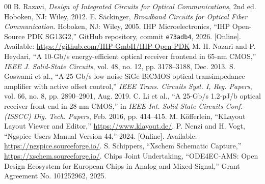 \documentclass[conference]{IEEEtran}
\begin{document}
\begin{thebibliography}{00}
 B. Razavi, \textit{Design of Integrated Circuits for Optical Communications}, 2nd ed. Hoboken, NJ: Wiley, 2012.
 E. S\"ackinger, \textit{Broadband Circuits for Optical Fiber Communication}. Hoboken, NJ: Wiley, 2005.
 IHP Microelectronics, ``IHP Open-Source PDK SG13G2,'' GitHub repository, commit \texttt{e73adb4}, 2026. [Online]. Available: \url{https://github.com/IHP-GmbH/IHP-Open-PDK}
 M. H. Nazari and P. Heydari, ``A 10-Gb/s energy-efficient optical receiver frontend in 65-nm CMOS,'' \textit{IEEE J. Solid-State Circuits}, vol. 48, no. 12, pp. 3178--3188, Dec. 2013.
 S. Goswami et al., ``A 25-Gb/s low-noise SiGe-BiCMOS optical transimpedance amplifier with active offset control,'' \textit{IEEE Trans. Circuits Syst. I, Reg. Papers}, vol. 66, no. 8, pp. 2890--2901, Aug. 2019.
 C. Li et al., ``A 25-Gb/s 1.2-pJ/b optical receiver front-end in 28-nm CMOS,'' in \textit{IEEE Int. Solid-State Circuits Conf. (ISSCC) Dig. Tech. Papers}, Feb. 2016, pp. 414--415.
 M. K\"offerlein, ``KLayout Layout Viewer and Editor,'' \url{https://www.klayout.de/}.
 P. Nenzi and H. Vogt, ``Ngspice Users Manual Version 44,'' 2024. [Online]. Available: \url{https://ngspice.sourceforge.io/}.
 S. Schippers, ``Xschem Schematic Capture,'' \url{https://xschem.sourceforge.io/}.
 Chips Joint Undertaking, ``ODE4EC-AMS: Open Design Ecosystem for European Chips in Analog and Mixed-Signal,'' Grant Agreement No. 101252962, 2025.
\end{thebibliography}
\end{document}
